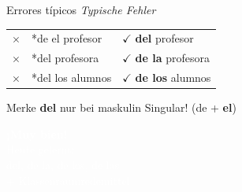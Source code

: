 \documentclass[aspectratio=169, 11pt]{beamer}
\newcommand{\de}[1]{\textit{\textcolor{mittelgrau}{#1}}}
\begin{document}
\begin{frame}{Errores típicos \de{Typische Fehler}}
    \vspace{0.5cm}

    \renewcommand{\arraystretch}{1.8}
    \begin{tabular}{cll}
        \textcolor{falsch}{\Large$\times$} & *de el profesor & \textcolor{richtig}{\Large$\checkmark$} \textbf{del} profesor \\
        \textcolor{falsch}{\Large$\times$} & *del profesora & \textcolor{richtig}{\Large$\checkmark$} \textbf{de la} profesora \\
        \textcolor{falsch}{\Large$\times$} & *del los alumnos & \textcolor{richtig}{\Large$\checkmark$} \textbf{de los} alumnos \\
    \end{tabular}

    \vspace{1cm}

    \begin{block}{Merke}
        \textbf{del} nur bei maskulin Singular! (de + \textbf{el})
    \end{block}
\end{frame}

\begin{frame}[plain]
    \vspace{3cm}
    \begin{center}
        {\Huge\bfseries\textcolor{white}{¡Muy bien!}}\\[1cm]
        {\Large\textcolor{white}{Heute gelernt:}}\\[0.5cm]
        {\large\textcolor{white}{del, de la, de los, de las}}\\[0.3cm]
        {\large\textcolor{white}{+ Klassenraumredemittel}}
    \end{center}
\end{frame}
\end{document}
